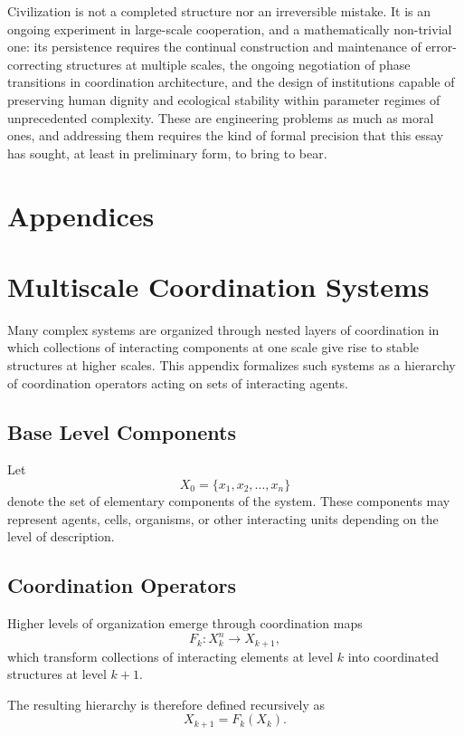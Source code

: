 \documentclass[12pt]{article}
\begin{document}
Civilization is not a completed structure nor an irreversible mistake. It is an ongoing experiment in large-scale cooperation, and a mathematically non-trivial one: its persistence requires the continual construction and maintenance of error-correcting structures at multiple scales, the ongoing negotiation of phase transitions in coordination architecture, and the design of institutions capable of preserving human dignity and ecological stability within parameter regimes of unprecedented complexity. These are engineering problems as much as moral ones, and addressing them requires the kind of formal precision that this essay has sought, at least in preliminary form, to bring to bear.

\newpage
\section*{Appendices}

\appendix

\section{Multiscale Coordination Systems}

Many complex systems are organized through nested layers of coordination in which collections of interacting components at one scale give rise to stable structures at higher scales. This appendix formalizes such systems as a hierarchy of coordination operators acting on sets of interacting agents.

\subsection{Base Level Components}

Let
\[
X_0 = \{x_1, x_2, \dots , x_n\}
\]
denote the set of elementary components of the system. These components may represent agents, cells, organisms, or other interacting units depending on the level of description.

\subsection{Coordination Operators}

Higher levels of organization emerge through coordination maps
\[
F_k : X_k^n \rightarrow X_{k+1},
\]
which transform collections of interacting elements at level $k$ into coordinated structures at level $k+1$.

The resulting hierarchy is therefore defined recursively as
\[
X_{k+1} = F_k(X_k).
\]
\end{document}

